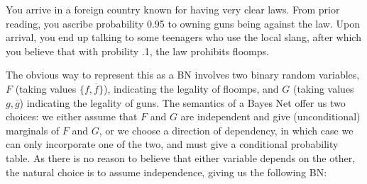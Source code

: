 \documentclass{article}
\numberwithin{equation}{section}
\begin{document}
\begin{notfocus}
	\begin{example}\label{ex:guns-and-floomps}
		You arrive in a foreign country known for having very clear laws. From prior reading, you ascribe probability 0.95 to owning guns being against the law. Upon arrival, you end up talking to some teenagers who use the local slang, 
		after which you believe that with probility .1, the law prohibits floomps. 
		
		The obvious way to represent this as a BN involves two binary random variables, $F$ (taking values $\{f, \overline f\}$), indicating the legality of floomps, and $G$ (taking values $g, \overline g$) indicating the legality of guns. 
		The semantics of a Bayes Net offer us two choices:
		we either assume that $F$ and $G$ are independent and give
		(unconditional) marginals of $F$ and $G$, or we choose a
		direction of dependency, in which case we can only 
		incorporate one of the two, and must give a conditional probability table.           
		As there is no reason to believe that either variable depends on the
		other, the natural choice is to assume independence, giving us the
		following BN:
		
		
		\begin{center}
		\end{center}
		

\end{example}
\end{notfocus}
\end{document}
